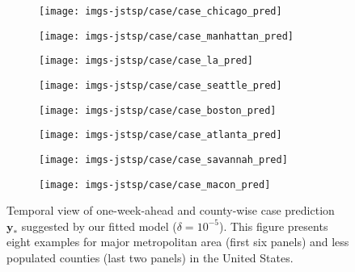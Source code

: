 \documentclass[journal]{IEEEtran}
\begin{document}
\begin{figure*}[!h]
\centering
\begin{subfigure}[h]{0.24\linewidth}
\texttt{[image: imgs-jstsp/case/case\_chicago\_pred]}
\end{subfigure}
\begin{subfigure}[h]{0.24\linewidth}
\texttt{[image: imgs-jstsp/case/case\_manhattan\_pred]}
\end{subfigure}
\begin{subfigure}[h]{0.24\linewidth}
\texttt{[image: imgs-jstsp/case/case\_la\_pred]}
\end{subfigure}
\begin{subfigure}[h]{0.24\linewidth}
\texttt{[image: imgs-jstsp/case/case\_seattle\_pred]}
\end{subfigure}
\vfill
\begin{subfigure}[h]{0.24\linewidth}
\texttt{[image: imgs-jstsp/case/case\_boston\_pred]}
\end{subfigure}
\begin{subfigure}[h]{0.24\linewidth}
\texttt{[image: imgs-jstsp/case/case\_atlanta\_pred]}
\end{subfigure}
\begin{subfigure}[h]{0.24\linewidth}
\texttt{[image: imgs-jstsp/case/case\_savannah\_pred]}
\end{subfigure}
\begin{subfigure}[h]{0.24\linewidth}
\texttt{[image: imgs-jstsp/case/case\_macon\_pred]}
\end{subfigure}
\caption{Temporal view of one-week-ahead and county-wise case prediction $\mathbf{y}_*$ suggested by our fitted model ($\delta = 10^{-5}$). This figure presents eight examples for major metropolitan area (first six panels) and less populated counties (last two panels) in the United States.}
\label{fig:case-prediction}
\end{figure*}
\end{document}
